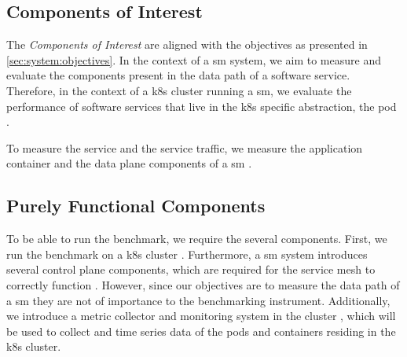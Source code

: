 \subsection{Components of Interest}
\label{sec:system:sut:components-interest}

The \textit{Components of Interest} are aligned with the objectives as presented in \cref{sec:system:objectives}. In the context of a \gls{sm} system, we aim to measure and evaluate the components present in the data path of a software service. Therefore, in the context of a \gls{k8s} cluster running a \gls{sm}, we evaluate the performance of software services that live in the \gls{k8s} specific abstraction, the \gls{pod} .

To measure the service and the service traffic, we measure the application container  and the data plane components of a \gls{sm} .

\subsection{Purely Functional Components}
\label{sec:system:sut:components-functional}

To be able to run the benchmark, we require the several components. First, we run the benchmark on a \gls{k8s} cluster . Furthermore, a \gls{sm} system introduces several control plane components, which are required for the service mesh to correctly function . However, since our objectives are to measure the data path of a \gls{sm} they are not of importance to the benchmarking instrument. Additionally, we introduce a metric collector and monitoring system in the cluster , which will be used to collect and time series data of the pods and containers residing in the \gls{k8s} cluster.